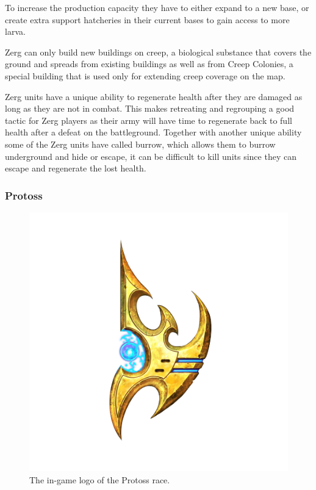 To increase the production capacity they have to either expand to a new base, or create extra support hatcheries in their current bases to gain access to more larva.

Zerg can only build new buildings on creep, a biological substance that covers the ground and spreads from existing buildings as well as from Creep Colonies, a special building that is used only for extending creep coverage on the map.

Zerg units have a unique ability to regenerate health after they are damaged as long as they are not in combat. This makes retreating and regrouping a good tactic for Zerg players as their army will have time to regenerate back to full health after a defeat on the battleground. Together with another unique ability some of the Zerg units have called burrow, which allows them to burrow underground and hide or escape, it can be difficult to kill units since they can escape and regenerate the lost health.

\subsubsection{Protoss}
\begin{figure}[h!tb]
\centering
\includegraphics[scale=0.25]{graphics/protossicon.png}
\caption{The in-game logo of the Protoss race.\cite{protosslogo}}
\end{figure}

